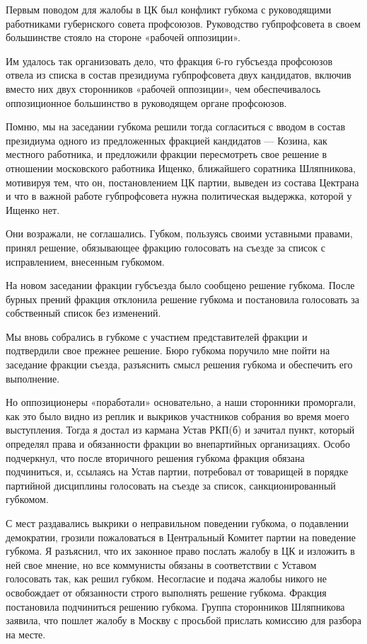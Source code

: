 \documentclass[12pt, a4paper, openany]{book}
\begin{document}
Первым поводом для жалобы в ЦК был конфликт губкома с руководящими работниками губернского совета профсоюзов. Руководство губпрофсовета в своем большинстве стояло на стороне «рабочей оппозиции».

Им удалось так организовать дело, что фракция 6-го губсъезда профсоюзов отвела из списка в состав президиума губпрофсовета двух кандидатов, включив вместо них двух сторонников «рабочей оппозиции», чем обеспечивалось оппозиционное большинство в руководящем органе профсоюзов.

Помню, мы на заседании губкома решили тогда согласиться с вводом в состав президиума одного из предложенных фракцией кандидатов — Козина, как местного работника, и предложили фракции пересмотреть свое решение в отношении московского работника Ищенко, ближайшего соратника Шляпникова, мотивируя тем, что он, постановлением ЦК партии, выведен из состава Цектрана и что в важной работе губпрофсовета нужна политическая выдержка, которой у Ищенко нет.

Они возражали, не соглашались. Губком, пользуясь своими уставными правами, принял решение, обязывающее фракцию голосовать на съезде за список с исправлением, внесенным губкомом.

На новом заседании фракции губсъезда было сообщено решение губкома. После бурных прений фракция отклонила решение губкома и постановила голосовать за собственный список без изменений.

Мы вновь собрались в губкоме с участием представителей фракции и подтвердили свое прежнее решение. Бюро губкома поручило мне пойти на заседание фракции съезда, разъяснить смысл решения губкома и обеспечить его выполнение.

Но оппозиционеры «поработали» основательно, а наши сторонники проморгали, как это было видно из реплик и выкриков участников собрания во время моего выступления. Тогда я достал из кармана Устав РКП(б) и зачитал пункт, который определял права и обязанности фракции во внепартийных организациях. Особо подчеркнул, что после вторичного решения губкома фракция обязана подчиниться, и, ссылаясь на Устав партии, потребовал от товарищей в порядке партийной дисциплины голосовать на съезде за список, санкционированный губкомом.

С мест раздавались выкрики о неправильном поведении губкома, о подавлении демократии, грозили пожаловаться в Центральный Комитет партии на поведение губкома. Я разъяснил, что их законное право послать жалобу в ЦК и изложить в ней свое мнение, но все коммунисты обязаны в соответствии с Уставом голосовать так, как решил губком. Несогласие и подача жалобы никого не освобождает от обязанности строго выполнять решение губкома. Фракция постановила подчиниться решению губкома. Группа сторонников Шляпникова заявила, что пошлет жалобу в Москву с просьбой прислать комиссию для разбора на месте.
\end{document}
